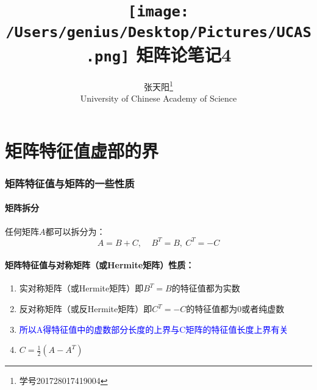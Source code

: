 \documentclass[12pt]{article}
\begin{document}
\begin{CJK*}{UTF8}{gbsn}

\begin{titlepage}
	
\title{\protect \texttt{[image: /Users/genius/Desktop/Pictures/UCAS.png]} \Huge \textbf{矩阵论笔记4}}

\author{张天阳\thanks{学号201728017419004}\\
University of Chinese Academy of Science}
\maketitle
\end{titlepage}



\tableofcontents

\pagebreak

\part{矩阵特征值虚部的界}
\section{矩阵特征值与矩阵的一些性质}
\subsection{矩阵拆分}
任何矩阵$A$都可以拆分为：
\begin{equation}
	A=B+C,~~~~~B^T=B,~C^T=-C
\end{equation}	
\subsection{矩阵特征值与对称矩阵（或Hermite矩阵）性质：}
\begin{enumerate}
	\item 实对称矩阵（或Hermite矩阵）即$B^T=B$的特征值都为实数
	\item 反对称矩阵（或反Hermite矩阵）即$C^T=-C$的特征值都为0或者纯虚数
	\item \textcolor{blue}{所以A得特征值中的虚数部分长度的上界与C矩阵的特征值长度上界有关}
	\item $C=\frac{1}{2}(A-A^T)$
\end{enumerate}

\end{CJK*}
\end{document}
